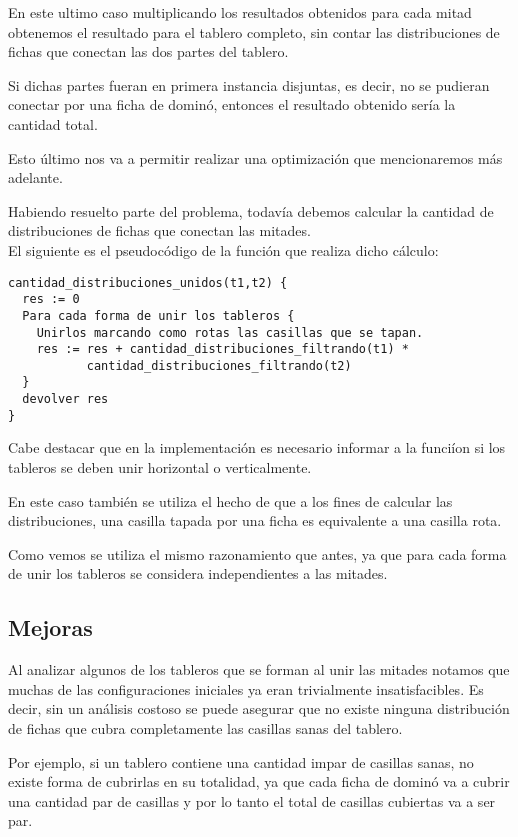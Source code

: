 \documentclass[a4paper, 12pt] {article}
\begin{document}
En este ultimo caso multiplicando los resultados obtenidos para cada mitad obtenemos el resultado para el tablero completo, sin contar las distribuciones de fichas que conectan las dos partes del tablero.  


Si dichas partes fueran en primera instancia disjuntas, es decir, no se pudieran conectar por una ficha de domin\'o, entonces el resultado obtenido ser\'ia la cantidad total. 


Esto \'ultimo nos va a permitir realizar una optimizaci\'on que mencionaremos m\'as adelante. 


Habiendo resuelto parte del problema, todav\'ia debemos calcular la cantidad de distribuciones de fichas que conectan las mitades. \\
El siguiente es el pseudoc\'odigo de la funci\'on que realiza dicho c\'alculo:

\begin{verbatim}
cantidad_distribuciones_unidos(t1,t2) {
  res := 0
  Para cada forma de unir los tableros {
    Unirlos marcando como rotas las casillas que se tapan.
    res := res + cantidad_distribuciones_filtrando(t1) * 
           cantidad_distribuciones_filtrando(t2)
  }
  devolver res
}
\end{verbatim}
Cabe destacar que en la implementaci\'on es necesario informar a la funci\'ion si los tableros se deben unir horizontal o verticalmente. 


En este caso tambi\'en se utiliza el hecho de que a los fines de calcular las distribuciones, una casilla tapada por una ficha es equivalente a una casilla rota.


Como vemos se utiliza el mismo razonamiento que antes, ya que para cada forma de unir los tableros se considera independientes a las mitades.


\subsection*{Mejoras}
Al analizar algunos de los tableros que se forman al unir las mitades notamos que muchas de las configuraciones iniciales ya eran trivialmente insatisfacibles. Es decir, sin un an\'alisis costoso se puede asegurar que no existe ninguna distribuci\'on de fichas que cubra completamente las casillas sanas del tablero. 


Por ejemplo, si un tablero contiene una cantidad impar de casillas sanas, no existe forma de cubrirlas en su totalidad, ya que cada ficha de domin\'o va a cubrir una cantidad par de casillas y por lo tanto el total de casillas cubiertas va a ser par.
\end{document}
